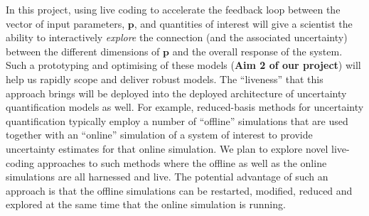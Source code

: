 In this project, using live coding to accelerate the feedback loop between the vector of input parameters,
$\mathbf{p}$,  and quantities of interest  will give a scientist the ability to interactively
\emph{explore} the connection (and the associated uncertainty) between
the different dimensions of $\mathbf{p}$ and the overall response of
the system. Such a prototyping and optimising of these models ({\bf Aim 2 of our project}) will help us rapidly scope and deliver 
robust models. The ``liveness'' that this approach brings will be deployed 
into the deployed architecture of uncertainty quantification models as well. For example, reduced-basis methods for uncertainty 
quantification typically employ a number of ``offline'' simulations that are used together with an ``online'' simulation of 
a system of interest to provide uncertainty estimates for that online simulation. We plan to explore novel live-coding
approaches to such methods where the offline as well as the online simulations are all harnessed and live. The 
potential advantage of such an approach is that the offline simulations can be restarted, modified, reduced and 
explored at the same time that the online simulation is running. 








